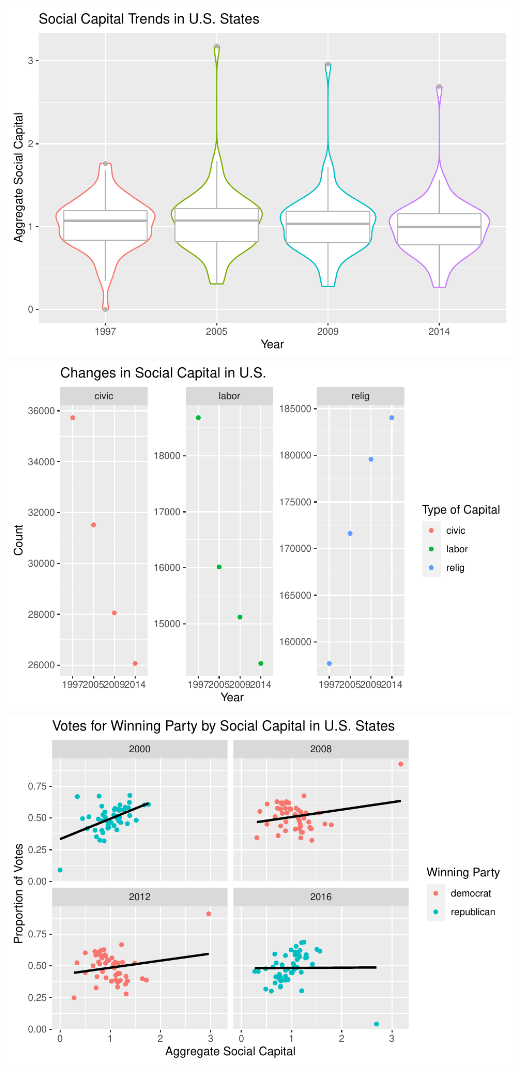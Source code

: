 \documentclass[
  english,
  man]{apa6}
\begin{document}
\includegraphics{Script_files/figure-latex/unnamed-chunk-1-1.pdf} \includegraphics{Script_files/figure-latex/unnamed-chunk-1-2.pdf} \includegraphics{Script_files/figure-latex/unnamed-chunk-1-3.pdf}
\end{document}
